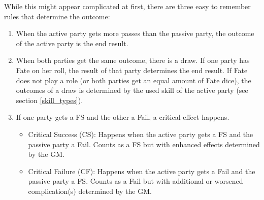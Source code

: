 While this might appear complicated at first, there are three easy to remember rules that determine the outcome:
\begin{enumerate}
	\item When the active party gets more passes than the passive party, the outcome of the active party is the end result.
	\item When both parties get the same outcome, there is a draw. If one party has Fate on her roll, the result of that party determines the end result. If Fate does not play a role (or both parties get an equal amount of Fate dice), the outcomes of a draw is determined by the used skill of the active party (see section \ref{skill_types}).
	\item If one party gets a FS and the other a Fail, a critical effect happens. 
	\begin{itemize}
		\item Critical Success (CS): Happens when the active party gets a FS and the passive party a Fail. Counts as a FS but with enhanced effects determined by the GM.
		\item Critical Failure (CF): Happens when the active party gets a Fail and the passive party a FS. Counts as a Fail but with additional or worsened complication(s) determined by the GM.
	\end{itemize}

\end{enumerate}



